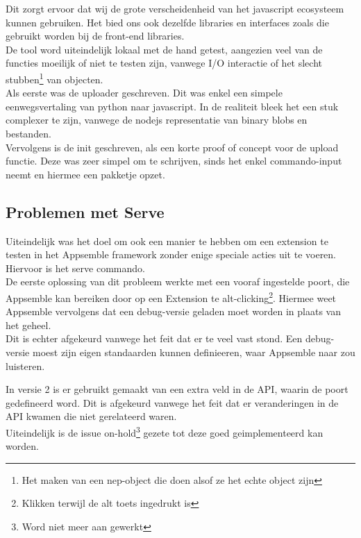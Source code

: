 Dit zorgt ervoor dat wij de grote verscheidenheid van het javascript ecosysteem kunnen gebruiken. Het bied ons ook dezelfde libraries en interfaces zoals die gebruikt worden bij de front-end libraries. \\ 

De tool word uiteindelijk lokaal met de hand getest, aangezien veel van de functies moeilijk of niet te testen zijn, vanwege I/O interactie of het slecht stubben\footnote{Het maken van een nep-object die doen alsof ze het echte object zijn} van objecten. \\

Als eerste was de uploader geschreven. Dit was enkel een simpele eenwegsvertaling van python naar javascript. In de realiteit bleek het een stuk complexer te zijn, vanwege de nodejs representatie van binary blobs en bestanden. \\ 

Vervolgens is de init geschreven, als een korte proof of concept voor de upload functie. Deze was zeer simpel om te schrijven, sinds het enkel commando-input neemt en hiermee een pakketje opzet. \\

\subsection{Problemen met Serve}

Uiteindelijk was het doel om ook een manier te hebben om een extension te testen in het Appsemble framework zonder enige speciale acties uit te voeren. Hiervoor is het serve commando. \\

De eerste oplossing van dit probleem werkte met een vooraf ingestelde poort, die Appsemble kan bereiken door op een Extension te alt-clicking\footnote{Klikken terwijl de alt toets ingedrukt is}. Hiermee weet Appsemble vervolgens dat een debug-versie geladen moet worden in plaats van het geheel. \\

Dit is echter afgekeurd vanwege het feit dat er te veel vast stond. Een debug-versie moest zijn eigen standaarden kunnen definieeren, waar Appsemble naar zou luisteren.

In versie 2 is er gebruikt gemaakt van een extra veld in de API, waarin de poort gedefineerd word. Dit is afgekeurd vanwege het feit dat er veranderingen in de API kwamen die niet gerelateerd waren. \\

Uiteindelijk is de issue on-hold\footnote{Word niet meer aan gewerkt} gezete tot deze goed geimplementeerd kan worden.